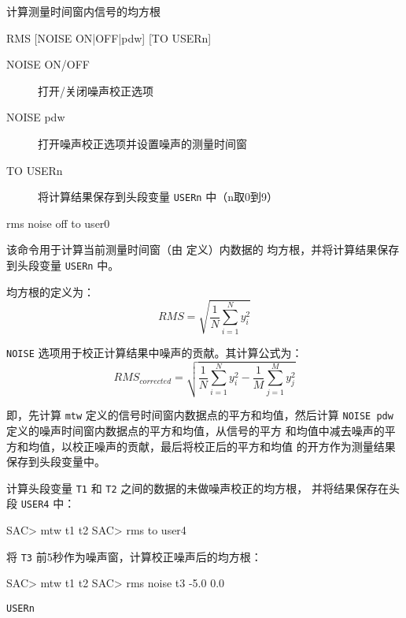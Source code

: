 \label{cmd:rms}

计算测量时间窗内信号的均方根

\begin{SACSTX}
RMS [NOISE ON|OFF|pdw] [TO USERn]
\end{SACSTX}

\begin{description}
\item [NOISE ON/OFF] 打开/关闭噪声校正选项
\item [NOISE pdw] 打开噪声校正选项并设置噪声的测量时间窗 
\item [TO USERn] 将计算结果保存到头段变量 \texttt{USERn} 中（n取0到9）
\end{description}

\begin{SACDFT}
rms noise off to user0
\end{SACDFT}

该命令用于计算当前测量时间窗（由  定义）内数据的
均方根，并将计算结果保存到头段变量 \texttt{USERn} 中。

均方根的定义为：
\[
 RMS = \sqrt{\frac{1}{N} \sum_{i=1}^N y_i^2}
\]

\texttt{NOISE} 选项用于校正计算结果中噪声的贡献。其计算公式为：
\[
    RMS_{corrected} = \sqrt{\frac{1}{N} \sum_{i=1}^N y_i^2 -
            \frac{1}{M} \sum_{j=1}^M y_j^2}
\]

即，先计算 \texttt{mtw} 定义的信号时间窗内数据点的平方和均值，然后计算
\texttt{NOISE pdw} 定义的噪声时间窗内数据点的平方和均值，从信号的平方
和均值中减去噪声的平方和均值，以校正噪声的贡献，最后将校正后的平方和均值
的开方作为测量结果保存到头段变量中。

计算头段变量 \texttt{T1} 和 \texttt{T2} 之间的数据的未做噪声校正的均方根，
并将结果保存在头段 \texttt{USER4} 中：
\begin{SACCode}
SAC> mtw t1 t2
SAC> rms to user4
\end{SACCode}

将 \texttt{T3} 前5秒作为噪声窗，计算校正噪声后的均方根：
\begin{SACCode}
SAC> mtw t1 t2
SAC> rms noise t3 -5.0 0.0
\end{SACCode}

\texttt{USERn}
